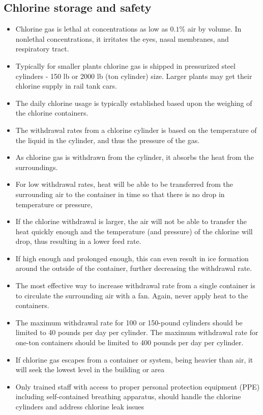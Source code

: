 \subsection{Chlorine storage and safety}
\begin{itemize}
	\item Chlorine gas is lethal at concentrations as low as $0.1 \%$ air by volume. In nonlethal concentrations, it irritates the eyes, nasal membranes, and respiratory tract.
	\item Typically for smaller plants chlorine gas is shipped in  pressurized steel cylinders - 150 lb or 2000 lb (ton cylinder) size.  Larger plants may get their chlorine supply in rail tank cars.  
	\item The daily chlorine usage is typically established based upon the weighing of the chlorine containers.
	\item The withdrawal rates from a chlorine cylinder is based on the temperature of the liquid in the cylinder, and thus the pressure of the gas. 
	\item As chlorine gas is withdrawn from the cylinder, it absorbs the heat from the surroundings.
	\item For low withdrawal rates, heat will be able to be transferred from the surrounding air to the container in time so that there is no drop in temperature or pressure, 
	\item If the chlorine withdrawal is larger, the air will not be able to transfer the heat quickly enough and the temperature (and pressure) of the chlorine will drop, thus resulting in a lower feed rate. 
	\item If high enough and prolonged enough, this can even result in ice formation around the outside of the container, further decreasing the withdrawal rate. 
	\item The most effective way to increase withdrawal rate from a single container is to circulate the surrounding air with a fan. Again, never apply heat to the containers.
	\item The maximum withdrawal rate for 100 or 150-pound cylinders should be limited to 40 pounds per day per cylinder. The maximum withdrawal rate for one-ton containers should be limited to 400 pounds per day per cylinder.
	\item If chlorine gas escapes from a container or system, being heavier than air, it will seek the lowest level in the building or area
	\item Only trained staff with access to proper personal protection equipment (PPE) including self-contained breathing apparatus, should handle the chlorine cylinders and address chlorine leak issues 

\end{itemize}
